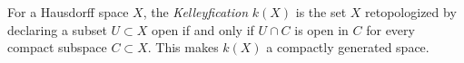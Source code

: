 For a Hausdorff space $X$, the \emph{Kelleyfication} $k(X)$ is the set $X$ retopologized by declaring a subset $U \subset X$ open if and only if $U \cap C$ is open in $C$ for every compact subspace $C \subset X$. This makes $k(X)$ a compactly generated space.
